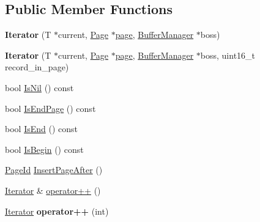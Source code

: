 \subsection*{Public Member Functions}
\begin{DoxyCompactItemize}
\item 
\mbox{\label{class_buffer_manager_1_1_iterator_a0d5aacb00677dbdb1aa067adc558989d}} 
{\bfseries Iterator} (T $\ast$current, \mbox{\hyperlink{struct_page}{Page}} $\ast$\mbox{\hyperlink{class_buffer_manager_1_1_iterator_a5a17d8377bc10f437e29b058c0376b15}{page}}, \mbox{\hyperlink{class_buffer_manager}{Buffer\+Manager}} $\ast$boss)
\item 
\mbox{\label{class_buffer_manager_1_1_iterator_a6414a46039bea055f379c58ec48a8f21}} 
{\bfseries Iterator} (T $\ast$current, \mbox{\hyperlink{struct_page}{Page}} $\ast$\mbox{\hyperlink{class_buffer_manager_1_1_iterator_a5a17d8377bc10f437e29b058c0376b15}{page}}, \mbox{\hyperlink{class_buffer_manager}{Buffer\+Manager}} $\ast$boss, uint16\+\_\+t record\+\_\+in\+\_\+page)
\item 
bool \mbox{\hyperlink{class_buffer_manager_1_1_iterator_ad19030c51bf30e6d6e9e2e560cc511c4}{Is\+Nil}} () const
\item 
bool \mbox{\hyperlink{class_buffer_manager_1_1_iterator_a6afaceac9683f05d9e1ecfc9ff5f3a0f}{Is\+End\+Page}} () const
\item 
bool \mbox{\hyperlink{class_buffer_manager_1_1_iterator_a02a38a84fd54e45d06818d2807b172d8}{Is\+End}} () const
\item 
bool \mbox{\hyperlink{class_buffer_manager_1_1_iterator_a7ce4145bd6263f8003c4c4dee01a9c31}{Is\+Begin}} () const
\item 
\mbox{\hyperlink{struct_generic_i_o_id}{Page\+Id}} \mbox{\hyperlink{class_buffer_manager_1_1_iterator_affb973bacb2deef1704e20221fb3c3fb}{Insert\+Page\+After}} ()
\item 
\mbox{\hyperlink{class_buffer_manager_1_1_iterator}{Iterator}} \& \mbox{\hyperlink{class_buffer_manager_1_1_iterator_aabf5af4d55b46c14bddff0e7caab3665}{operator++}} ()
\item 
\mbox{\label{class_buffer_manager_1_1_iterator_a8d6866a6f0c406e15dc1b71737e1f3d2}} 
\mbox{\hyperlink{class_buffer_manager_1_1_iterator}{Iterator}} {\bfseries operator++} (int)
\item 

\end{DoxyCompactItemize}
